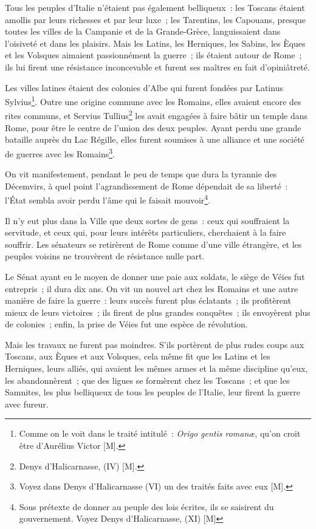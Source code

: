 \documentclass[french,twoside]{book} %
\begin{document}
Tous les peuples d’Italie n’étaient pas également belliqueux : les Toscans étaient amollis par leurs richesses et par leur luxe ; les Tarentins, les Capouans, presque toutes les villes de la Campanie et de la Grande-Grèce, languissaient dans l’oisiveté et dans les plaisirs. Mais les Latins, les Herniques, les Sabins, les Èques et les Volsques aimaient passionnément la guerre ; ils étaient autour de Rome ; ils lui firent une résistance inconcevable et furent ses maîtres en fait d’opiniâtreté.\par
Les villes latines étaient des colonies d’Albe qui furent fondées par Latinus Sylvius\footnote{Comme on le voit dans le traité intitulé : {\itshape Origo gentis romanæ}, qu’on croit être d’Aurélius Victor [M].}. Outre une origine commune avec les Romains, elles avaient encore des rites communs, et Servius Tullius\footnote{Denys d’Halicarnasse, (IV) [M].} les avait engagées à faire bâtir un temple dans Rome, pour être le centre de l’union des deux peuples. Ayant perdu une grande bataille auprès du Lac Régille, elles furent soumises à une alliance et une société de guerres avec les Romains\footnote{Voyez dans Denys d’Halicarnasse (VI) un des traités faits avec eux [M].}.\par
On vit manifestement, pendant le peu de temps que dura la tyrannie des Décemvirs, à quel point l’agrandissement de Rome dépendait de sa liberté : l’État sembla avoir perdu l’âme qui le faisait mouvoir\footnote{Sous prétexte de donner au peuple des lois écrites, ils se saisirent du gouvernement. Voyez Denys d’Halicarnasse, (XI) [M]}.\par
Il n’y eut plus dans la Ville que deux sortes de gens : ceux qui souffraient la servitude, et ceux qui, pour leurs intérêts particuliers, cherchaient à la faire souffrir. Les sénateurs se retirèrent de Rome comme d’une ville étrangère, et les peuples voisins ne trouvèrent de résistance nulle part.\par
Le Sénat ayant eu le moyen de donner une paie aux soldats, le siège de Véies fut entrepris ; il dura dix ans. On vit un nouvel art chez les Romains et une autre manière de faire la guerre : leurs succès furent plus éclatants ; ils profitèrent mieux de leurs victoires ; ils firent de plus grandes conquêtes ; ils envoyèrent plus de colonies ; enfin, la prise de Véies fut une espèce de révolution.\par
Mais les travaux ne furent pas moindres. S’ils portèrent de plus rudes coups aux Toscans, aux Èques et aux Volsques, cela même fit que les Latins et les Herniques, leurs alliés, qui avaient les mêmes armes et la même discipline qu’eux, les abandonnèrent ; que des ligues se formèrent chez les Toscans ; et que les Samnites, les plus belliqueux de tous les peuples de l’Italie, leur firent la guerre avec fureur.\par
\end{document}
